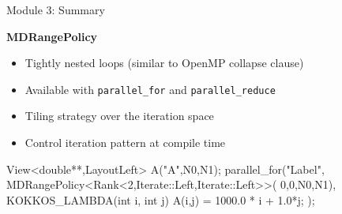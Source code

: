 \begin{frame}[fragile]{Module 3: Summary}

	\textbf{MDRangePolicy}
        \begin{itemize}
                \item Tightly nested loops (similar to OpenMP collapse clause)
                \item Available with \texttt{parallel\_for} and \texttt{parallel\_reduce}
                \item Tiling strategy over the iteration space
                \item Control iteration pattern at compile time
        \end{itemize}

\begin{code}[keywords={double,Iterate,Left,Right,int,MDRangePolicy,Rank}]
View<double**,LayoutLeft> A("A",N0,N1);
parallel_for("Label",
  MDRangePolicy<Rank<2,Iterate::Left,Iterate::Left>>(
	{0,0},{N0,N1}),
  KOKKOS_LAMBDA(int i, int j) {
    A(i,j) = 1000.0 * i + 1.0*j;
});
\end{code}

\end{frame}

